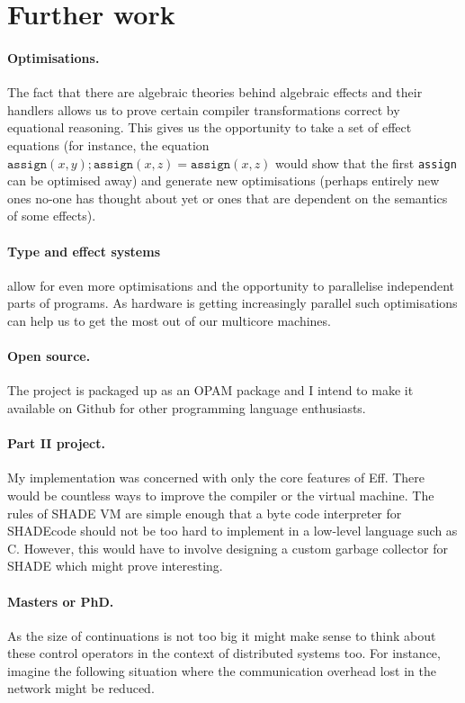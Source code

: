 \documentclass[class=article, crop=false]{standalone}
\begin{document}
\section{Further work}

\paragraph{Optimisations.}
The fact that there are algebraic theories behind algebraic effects and their
handlers allows us to prove certain compiler transformations correct by
equational reasoning. This gives us the opportunity to take a set of effect
equations (for instance, the equation $\mathtt{assign}(x,y); \mathtt{assign}(x,z) =
\mathtt{assign}(x, z)$ would show that the first \texttt{assign} can be optimised
away) and generate new optimisations (perhaps entirely new ones no-one has
thought about yet or ones that are dependent on the semantics of some effects).

\paragraph{Type and effect systems}
\cite{bauer2013effect} allow for even more optimisations
and the opportunity to parallelise independent parts of programs. As hardware is
getting increasingly parallel such optimisations can help us to get the most out
of our multicore machines.

\paragraph{Open source.}
The project is packaged up as an OPAM package and I intend to make it available
on Github for other programming language enthusiasts.

\paragraph{Part II project.}
My implementation was concerned with only the core
features of Eff. There would be countless ways to improve the compiler or the
virtual machine. The rules of SHADE VM are simple enough that a byte code interpreter
for SHADEcode should not be too hard to implement in a low-level language such as C.
However, this would have to involve designing a custom garbage collector for SHADE
which might prove interesting.

\paragraph{Masters or PhD.}
As the size of continuations is not too big it might make sense to think about
these control operators in the context of distributed systems too.
For instance, imagine the following situation where the communication overhead
lost in the network might be reduced.
\end{document}

